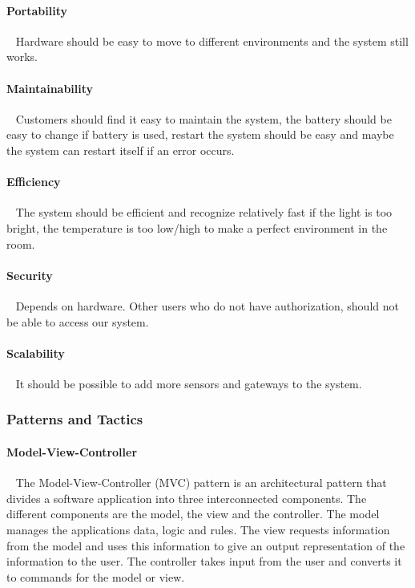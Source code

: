 \documentclass[../document]{subfiles}
\begin{document}
\paragraph{Portability} \ \newline
Hardware should be easy to move to different environments and the system still works.

\paragraph{Maintainability} \ \newline
Customers should find it easy to maintain the system, the battery should be easy to change if battery is used, restart the system should be easy and maybe the system can restart itself if an error occurs. 

\paragraph{Efficiency} \ \newline
The system should be efficient and recognize relatively fast if the light is too bright, the temperature is too low/high to make a perfect environment in the room. 

\paragraph{Security} \ \newline
Depends on hardware. Other users who do not have authorization, should not be able to access our system.

\paragraph{Scalability} \ \newline
It should be possible to add more sensors and gateways to the system.  

\subsubsection{Patterns and Tactics}
\paragraph{Model-View-Controller}  \ \newline
The Model-View-Controller (MVC) pattern is an architectural pattern that divides a software application into three interconnected components. The different components are the model, the view and the controller. The model manages the applications data, logic and rules. The view requests information from the model and uses this information to give an output representation of the information to the user. The controller takes input from the user and converts it to commands for the model or view. 
\end{document}
